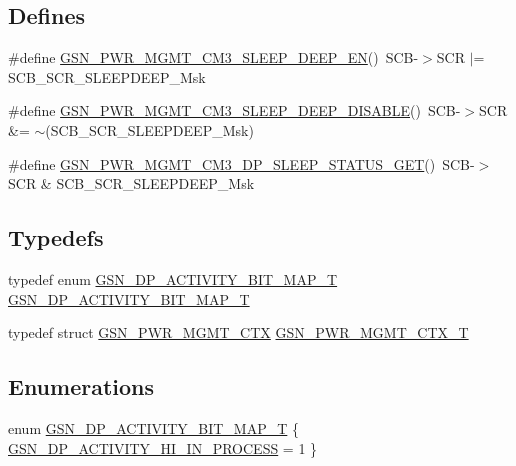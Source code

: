 \subsection*{Defines}
\begin{DoxyCompactItemize}
\item 
\#define \hyperlink{a00541_a2fc8f0d83dd46818c142e356193d20d1}{GSN\_\-PWR\_\-MGMT\_\-CM3\_\-SLEEP\_\-DEEP\_\-EN}()~SCB-\/$>$SCR $|$= SCB\_\-SCR\_\-SLEEPDEEP\_\-Msk
\item 
\#define \hyperlink{a00541_adeb86c5114f129ed3d14320383eab25d}{GSN\_\-PWR\_\-MGMT\_\-CM3\_\-SLEEP\_\-DEEP\_\-DISABLE}()~SCB-\/$>$SCR \&= $\sim$(SCB\_\-SCR\_\-SLEEPDEEP\_\-Msk)
\item 
\#define \hyperlink{a00541_ae093b81b0690633cee4ace9276433844}{GSN\_\-PWR\_\-MGMT\_\-CM3\_\-DP\_\-SLEEP\_\-STATUS\_\-GET}()~SCB-\/$>$SCR \& SCB\_\-SCR\_\-SLEEPDEEP\_\-Msk
\end{DoxyCompactItemize}
\subsection*{Typedefs}
\begin{DoxyCompactItemize}
\item 
typedef enum \hyperlink{a00541_a5b011c4f2fa22db81cedb1ff114a4bfe}{GSN\_\-DP\_\-ACTIVITY\_\-BIT\_\-MAP\_\-T} \hyperlink{a00541_a554e74f30cbd4d5a87771d6c2ea2a06d}{GSN\_\-DP\_\-ACTIVITY\_\-BIT\_\-MAP\_\-T}
\item 
typedef struct \hyperlink{a00184}{GSN\_\-PWR\_\-MGMT\_\-CTX} \hyperlink{a00541_a10440ea6f2ea146cf321d77c90be38bb}{GSN\_\-PWR\_\-MGMT\_\-CTX\_\-T}
\end{DoxyCompactItemize}
\subsection*{Enumerations}
\begin{DoxyCompactItemize}
\item 
enum \hyperlink{a00541_a5b011c4f2fa22db81cedb1ff114a4bfe}{GSN\_\-DP\_\-ACTIVITY\_\-BIT\_\-MAP\_\-T} \{ \hyperlink{a00541_a5b011c4f2fa22db81cedb1ff114a4bfea1cab7dd13138a8aef7ed6eb93123101e}{GSN\_\-DP\_\-ACTIVITY\_\-HI\_\-IN\_\-PROCESS} =  1
 \}
\end{DoxyCompactItemize}

